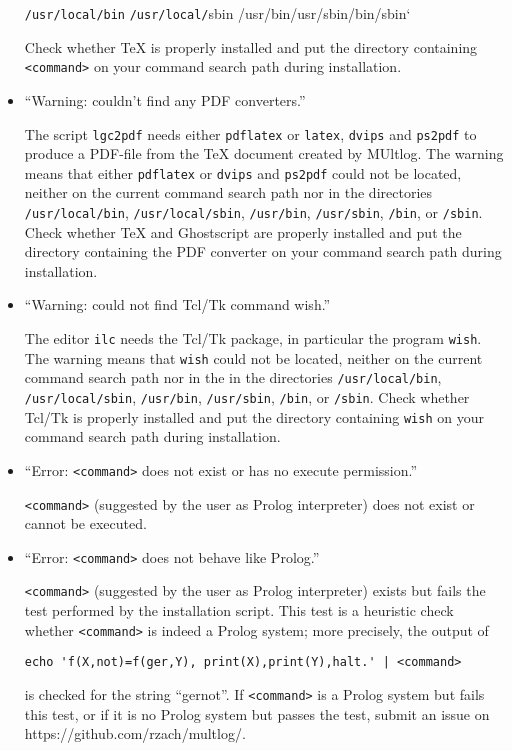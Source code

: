 \documentclass[]{article}
\begin{document}
\begin{itemize}
  \texttt{/usr/local/bin} \texttt{/usr/local/}sbin
  /usr/bin\texttt{}/usr/sbin\texttt{}/bin\texttt{}/sbin`

  Check whether TeX is properly installed and put the directory
  containing \texttt{\textless{}command\textgreater{}} on your command
  search path during installation.
\item
  ``Warning: couldn't find any PDF converters.''

  The script \texttt{lgc2pdf} needs either \texttt{pdflatex} or
  \texttt{latex}, \texttt{dvips} and \texttt{ps2pdf} to produce a
  PDF-file from the TeX document created by MUltlog. The warning means
  that either \texttt{pdflatex} or \texttt{dvips} and \texttt{ps2pdf}
  could not be located, neither on the current command search path nor
  in the directories \texttt{/usr/local/bin}, \texttt{/usr/local/sbin},
  \texttt{/usr/bin}, \texttt{/usr/sbin}, \texttt{/bin}, or
  \texttt{/sbin}. Check whether TeX and Ghostscript are properly
  installed and put the directory containing the PDF converter on your
  command search path during installation.
\item
  ``Warning: could not find Tcl/Tk command wish.''

  The editor \texttt{ilc} needs the Tcl/Tk package, in particular the
  program \texttt{wish}. The warning means that \texttt{wish} could not
  be located, neither on the current command search path nor in the in
  the directories \texttt{/usr/local/bin}, \texttt{/usr/local/sbin},
  \texttt{/usr/bin}, \texttt{/usr/sbin}, \texttt{/bin}, or
  \texttt{/sbin}. Check whether Tcl/Tk is properly installed and put the
  directory containing \texttt{wish} on your command search path during
  installation.
\item
  ``Error: \texttt{\textless{}command\textgreater{}} does not exist or
  has no execute permission.''

  \texttt{\textless{}command\textgreater{}} (suggested by the user as
  Prolog interpreter) does not exist or cannot be executed.
\item
  ``Error: \texttt{\textless{}command\textgreater{}} does not behave
  like Prolog.''

  \texttt{\textless{}command\textgreater{}} (suggested by the user as
  Prolog interpreter) exists but fails the test performed by the
  installation script. This test is a heuristic check whether
  \texttt{\textless{}command\textgreater{}} is indeed a Prolog system;
  more precisely, the output of

\begin{verbatim}
echo 'f(X,not)=f(ger,Y), print(X),print(Y),halt.' | <command>
\end{verbatim}

  is checked for the string ``gernot''. If
  \texttt{\textless{}command\textgreater{}} is a Prolog system but fails
  this test, or if it is no Prolog system but passes the test, submit an
  issue on https://github.com/rzach/multlog/.
\end{itemize}
\end{document}
